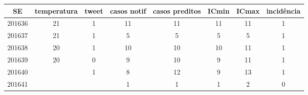 \begin{tabular}{c|ccccccc}
  \hline
SE & temperatura & tweet & casos notif & casos preditos & ICmin & ICmax & incidência \\ 
  \hline
201636 & 21 & 1 & 11 & 11 & 11 & 11 & 1 \\ 
  201637 & 21 & 1 & 5 & 5 & 5 & 5 & 1 \\ 
  201638 & 20 & 1 & 10 & 10 & 10 & 11 & 1 \\ 
  201639 & 20 & 0 & 9 & 10 & 9 & 11 & 1 \\ 
  201640 &  & 1 & 8 & 12 & 9 & 13 & 1 \\ 
  201641 &  &  & 1 & 1 & 1 & 2 & 0 \\ 
   \hline
\end{tabular}
